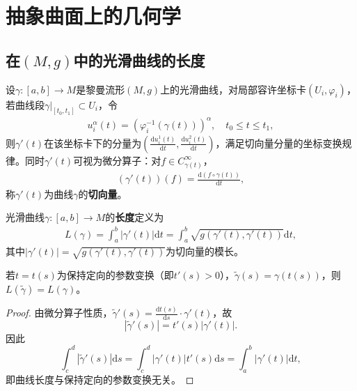 \documentclass[../../main.tex]{subfiles}%
\begin{document}
\section{抽象曲面上的几何学}

\subsection{在$(M,g)$中的光滑曲线的长度}

\begin{definition}
设$\gamma:[a,b]\to M$是黎曼流形$(M,g)$上的光滑曲线，对局部容许坐标卡$(U_i,\varphi_i)$，若曲线段$\gamma|_{[t_0,t_1]}\subset U_i$，令
\begin{align*}
u_i^\alpha(t)=(\varphi_i^{-1}(\gamma(t)))^\alpha,\quad t_0\leqslant t\leqslant t_1,
\end{align*}
则$\gamma'(t)$在该坐标卡下的分量为$\left(\frac{\mathrm{d}u_i^1(t)}{\mathrm{d}t},\frac{\mathrm{d}u_i^2(t)}{\mathrm{d}t}\right)$，满足切向量分量的坐标变换规律。同时$\gamma'(t)$可视为微分算子：对$f\in C^\infty_{\gamma(t)}$，
\begin{align*}
(\gamma'(t))(f)=\frac{\mathrm{d}(f\circ\gamma(t))}{\mathrm{d}t},
\end{align*}
称$\gamma'(t)$为曲线$\gamma$的\textbf{切向量}。
\end{definition}

\begin{definition}
光滑曲线$\gamma:[a,b]\to M$的\textbf{长度}定义为
\begin{align}
L(\gamma)=\int_{a}^{b}|\gamma'(t)|\mathrm{d}t=\int_{a}^{b}\sqrt{g(\gamma'(t),\gamma'(t))}\mathrm{d}t,\label{eq:curve_length}
\end{align}
其中$|\gamma'(t)|=\sqrt{g(\gamma'(t),\gamma'(t))}$为切向量的模长。
\end{definition}

\begin{theorem}
若$t=t(s)$为保持定向的参数变换（即$t'(s)>0$），$\tilde{\gamma}(s)=\gamma(t(s))$，则$L(\tilde{\gamma})=L(\gamma)$。
\end{theorem}

\begin{proof}
由微分算子性质，$\tilde{\gamma}'(s)=\frac{\mathrm{d}t(s)}{\mathrm{d}s}\cdot\gamma'(t)$，故
\[
|\tilde{\gamma}'(s)|=t'(s)|\gamma'(t)|.
\]
因此
\[
\int_{c}^{d}|\tilde{\gamma}'(s)|\mathrm{d}s=\int_{c}^{d}|\gamma'(t)|t'(s)\mathrm{d}s=\int_{a}^{b}|\gamma'(t)|\mathrm{d}t,
\]
即曲线长度与保持定向的参数变换无关。
\end{proof}
\end{document}

